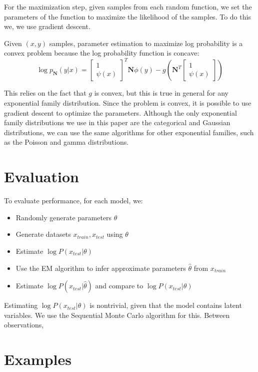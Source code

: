 \documentclass{article}
\begin{document}
    For the maximization step, given samples from each random function, we set the
    parameters of the function to maximize the likelihood of the samples.  To do this we,
    we use gradient descent.

    Given $(x, y)$ samples, parameter estimation to maximize log probability is a convex
    problem because the log probability function is concave:
    $$\log p_{\mathbf{N}}(y | x) = \begin{bmatrix} 1 \\ \psi(x) \end{bmatrix} ^T \mathbf{N} \phi(y) - g\left(\mathbf{N}^T \begin{bmatrix} 1 \\ \psi(x) \end{bmatrix}\right)$$

    This relies on the fact that $g$ is convex, but this is true in general for any exponential family distribution.
    Since the problem is convex, it is possible to use gradient descent to optimize the parameters.  Although
    the only exponential family distributions we use in this paper are the categorical and Gaussian distributions,
    we can use the same algorithms for other exponential families, such as the Poisson and gamma distributions.

  \section{Evaluation}

    To evaluate performance, for each model, we:
    \begin{itemize}
      \item
        Randomly generate parameters $\theta$
      \item
        Generate datasets $x_{train}, x_{test}$ using $\theta$
      \item
        Estimate $\log P(x_{test} | \theta)$
      \item
        Use the EM algorithm to infer approximate parameters $\hat{\theta}$ from $x_{train}$
      \item
        Estimate $\log P(x_{test} | \hat{\theta})$ and compare to $\log P(x_{test} | \theta)$
    \end{itemize}
    Estimating $\log P(x_{test} | \theta)$ is nontrivial, given that the model contains latent variables.
    We use the Sequential Monte Carlo algorithm for this.  Between observations,


  \section{Examples}
\end{document}

